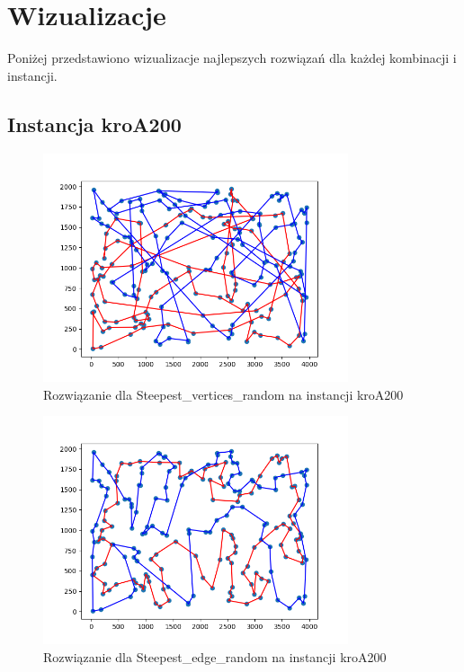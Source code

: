 \documentclass[12pt,a4paper]{article}
\begin{document}
\newpage

\section{Wizualizacje}
Poniżej przedstawiono wizualizacje najlepszych rozwiązań dla każdej kombinacji i instancji.

\subsection{Instancja kroA200}

\begin{figure}[H]
\centering
\includegraphics[width=0.8\textwidth]{figures/kroA_Steepest_V_random.png}
\caption{Rozwiązanie dla Steepest\_vertices\_random na instancji kroA200}
\end{figure}

\begin{figure}[H]
\centering
\includegraphics[width=0.8\textwidth]{figures/kroA_Steepest_E_random.png}
\caption{Rozwiązanie dla Steepest\_edge\_random na instancji kroA200}
\end{figure}
\end{document}
